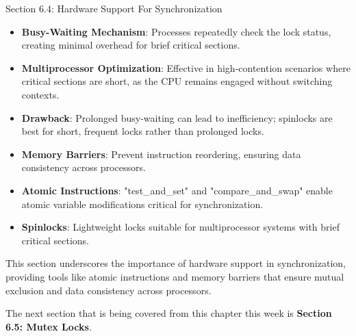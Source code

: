 \begin{notes}{Section 6.4: Hardware Support For Synchronization}
    \begin{highlight}
    
        \begin{itemize}
            \item \textbf{Busy-Waiting Mechanism}: Processes repeatedly check the lock status, creating minimal overhead for brief critical sections.
            \item \textbf{Multiprocessor Optimization}: Effective in high-contention scenarios where critical sections are short, as the CPU remains engaged without switching contexts.
            \item \textbf{Drawback}: Prolonged busy-waiting can lead to inefficiency; spinlocks are best for short, frequent locks rather than prolonged locks.
        \end{itemize}
    
    \end{highlight}
    
    \begin{highlight}
    
        \begin{itemize}
            \item \textbf{Memory Barriers}: Prevent instruction reordering, ensuring data consistency across processors.
            \item \textbf{Atomic Instructions}: "test\_and\_set" and "compare\_and\_swap" enable atomic variable modifications critical for synchronization.
            \item \textbf{Spinlocks}: Lightweight locks suitable for multiprocessor systems with brief critical sections.
        \end{itemize}
    
    This section underscores the importance of hardware support in synchronization, providing tools like atomic instructions and memory barriers that ensure mutual exclusion and data consistency across processors.
    
    \end{highlight}
\end{notes}

The next section that is being covered from this chapter this week is \textbf{Section 6.5: Mutex Locks}.

